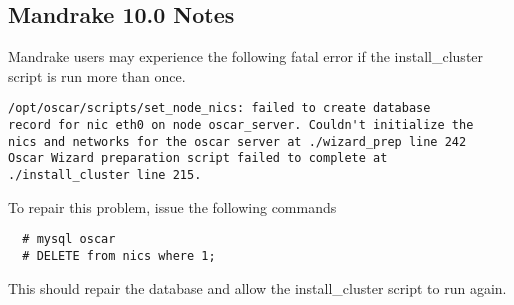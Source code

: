 \subsection{Mandrake 10.0 Notes}
\label{subsec:mdk10notes}

Mandrake users may experience the following fatal error if the
install_cluster script is run more than once.

\begin{verbatim}
/opt/oscar/scripts/set_node_nics: failed to create database
record for nic eth0 on node oscar_server. Couldn't initialize the
nics and networks for the oscar server at ./wizard_prep line 242
Oscar Wizard preparation script failed to complete at
./install_cluster line 215.
\end{verbatim}

To repair this problem, issue the following commands
\begin{verbatim}
  # mysql oscar
  # DELETE from nics where 1;
\end{verbatim}
This should repair the database and allow the install_cluster script
to run again.
\endchange

